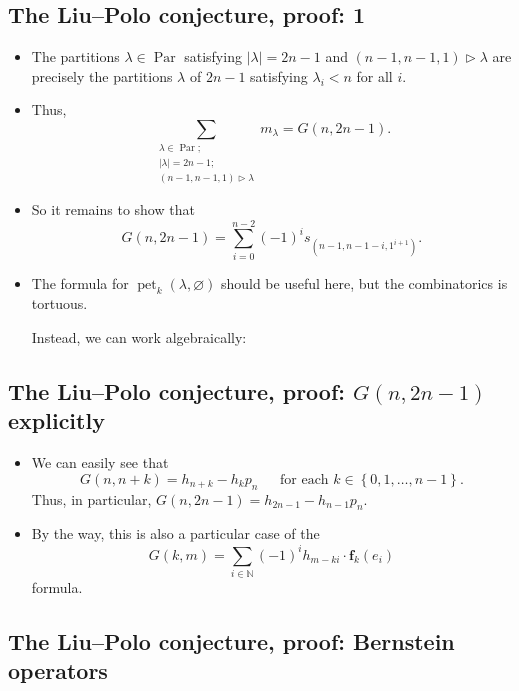 \documentclass[numbers=enddot,12pt,final,onecolumn,notitlepage]{scrartcl}%
\newcommand{\Par}{\operatorname{Par}}
\newcommand{\0}{\phantom{c}}
\let\sumnonlimits\sum
\renewcommand{\sum}{\sumnonlimits\limits}
\begin{document}
\subsection{The Liu--Polo conjecture, proof: 1}

\begin{itemize}
\item The partitions $\lambda\in\operatorname*{Par}$
satisfying $\left|\lambda\right| = 2n-1$
and $\left(  n-1,n-1,1\right)  \triangleright\lambda$ are precisely the
partitions $\lambda$ of $2n-1$ satisfying
$\lambda_{i}<n$ for all $i$.

\item Thus,
\[
\sum_{\substack{\lambda\in\Par;\\ \left|\lambda\right| = 2n-1;\\\left(
n-1,n-1,1\right)  \triangleright\lambda}}m_{\lambda}
=G\left(  n,2n-1\right)
.
\]


\item So it remains to show that%
\[
G\left(  n,2n-1\right)  =\sum_{i=0}^{n-2}\left(  -1\right)  ^{i}s_{\left(
n-1,n-1-i,1^{i+1}\right)  }.
\]


\item The formula for $\operatorname*{pet}\nolimits_{k}\left(  \lambda
,\varnothing\right)  $ should be useful here, but the combinatorics is tortuous.

Instead, we can work algebraically:
\end{itemize}

\subsection{The Liu--Polo conjecture, proof: $G(n, 2n-1)$ explicitly}

\begin{itemize}
\item We can easily see that
\[
G\left(  n,n+k\right)  =h_{n+k}-h_{k}p_{n}\ \ \ \ \ \ \ \text{for each }%
k\in\left\{  0,1,\ldots,n-1\right\}  .
\]
Thus, in particular, $G\left(  n,2n-1\right)  =h_{2n-1}-h_{n-1}p_{n}$.

\item By the way, this is also a particular case of the
\[
G\left(  k,m\right)  =\sum_{i\in\mathbb{N}}\left(  -1\right)  ^{i}%
h_{m-ki}\cdot\mathbf{f}_{k}\left(  e_{i}\right)
\]
formula.
\end{itemize}

\subsection{The Liu--Polo conjecture, proof: Bernstein operators}
\end{document}
